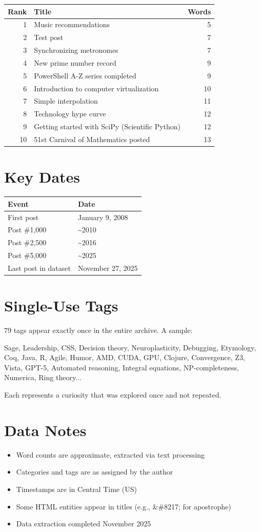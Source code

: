 \begin{longtable}{r p{6cm} r}
\toprule
\textbf{Rank} & \textbf{Title} & \textbf{Words} \tabularnewline
\midrule
1 & Music recommendations & 5 \tabularnewline
2 & Test post & 7 \tabularnewline
3 & Synchronizing metronomes & 7 \tabularnewline
4 & New prime number record & 9 \tabularnewline
5 & PowerShell A-Z series completed & 9 \tabularnewline
6 & Introduction to computer virtualization & 10 \tabularnewline
7 & Simple interpolation & 11 \tabularnewline
8 & Technology hype curve & 12 \tabularnewline
9 & Getting started with SciPy (Scientific Python) & 12 \tabularnewline
10 & 51st Carnival of Mathematics posted & 13 \tabularnewline
\bottomrule
\end{longtable}

\bigskip

\section*{Key Dates}

\begin{longtable}{l p{5.5cm}}
\toprule
\textbf{Event} & \textbf{Date} \tabularnewline
\midrule
First post & January 9, 2008 \tabularnewline
Post \#1,000 & \textasciitilde{}2010 \tabularnewline
Post \#2,500 & \textasciitilde{}2016 \tabularnewline
Post \#5,000 & \textasciitilde{}2025 \tabularnewline
Last post in dataset & November 27, 2025 \tabularnewline
\bottomrule
\end{longtable}

\bigskip

\section*{Single-Use Tags}

79 tags appear exactly once in the entire archive. A sample:

Sage, Leadership, CSS, Decision theory, Neuroplasticity, Debugging, Etymology, Coq, Java, R, Agile, Humor, AMD, CUDA, GPU, Clojure, Convergence, Z3, Vista, GPT-5, Automated reasoning, Integral equations, NP-completeness, Numerica, Ring theory...

Each represents a curiosity that was explored once and not repeated.

\bigskip

\section*{Data Notes}

\begin{itemize}
\item Word counts are approximate, extracted via text processing
\item Categories and tags are as assigned by the author
\item Timestamps are in Central Time (US)
\item Some HTML entities appear in titles (e.g., \&\#8217; for apostrophe)
\item Data extraction completed November 2025
\end{itemize}
